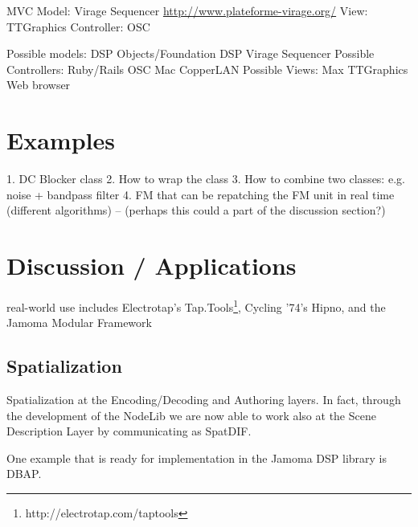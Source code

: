 \documentclass[twoside,10pt]{article}
\begin{document}
MVC
    Model: Virage Sequencer \url{http://www.plateforme-virage.org/}
    View: TTGraphics
    Controller: OSC
    
    
Possible models:
    DSP Objects/Foundation DSP
    Virage Sequencer
Possible Controllers:
    Ruby/Rails
    OSC
    Mac
    CopperLAN
Possible Views:
    Max
    TTGraphics
    Web browser





\section{Examples} %

1. DC Blocker class
2. How to wrap the class
3. How to combine two classes: e.g. noise + bandpass filter
4. FM that can be repatching the FM unit in real time (different algorithms)  -- (perhaps this could a part of the discussion section?) 




\section{Discussion / Applications} %

real-world use includes Electrotap's Tap.Tools\footnote{http://electrotap.com/taptools}, Cycling '74's Hipno\cite{Place:2005}, and the Jamoma Modular Framework\cite{Place:2006}


\subsection{Spatialization}

Spatialization at the Encoding/Decoding and Authoring layers\cite{Peters:2009}.  In fact, through the development of the NodeLib we are now able to work also at the Scene Description Layer by communicating as SpatDIF\cite{Peters:2008spatdif}.

One example that is ready for implementation in the Jamoma DSP library is DBAP\cite{Lossius:2009}.
\end{document}
